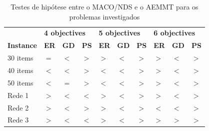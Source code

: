\begin{table}[htb]
	\centering
	\def\arraystretch{1.0}
	\caption{Testes de hipótese entre o MACO/NDS e o AEMMT para os problemas investigados}
	\label{tab_ztest_meamt}
	\begin{tabular}{llllllllll}
		& \multicolumn{3}{l}{\textbf{4 objectives}} & \multicolumn{3}{l}{\textbf{5 objectives}} & \multicolumn{3}{l}{\textbf{6 objectives
		}} \\
		\textbf{Instance} & \textbf{ER} & \textbf{GD} & \textbf{PS} & \textbf{ER} & \textbf{GD} & \textbf{PS} & \textbf{ER} & \textbf{GD} & \textbf{PS} \\ \hline
		30 items & \cellcolor{white} $=$ & \cellcolor{table-green} $<$ & \cellcolor{table-green} $>$ & \cellcolor{table-red} $>$ & \cellcolor{table-green} $<$ & \cellcolor{table-green} $>$ & \cellcolor{table-red} $>$ & \cellcolor{table-green} $<$ & \cellcolor{table-green} $>$ \\
		40 items & \cellcolor{table-green} $<$ & \cellcolor{table-green} $<$ & \cellcolor{table-green} $>$ & \cellcolor{table-green} $<$ & \cellcolor{table-green} $<$ & \cellcolor{table-green} $>$ & \cellcolor{table-red} $>$ & \cellcolor{table-green} $<$ & \cellcolor{table-green} $>$ \\
		50 items & \cellcolor{table-green} $<$ & \cellcolor{white} $=$ & \cellcolor{table-green} $>$ & \cellcolor{table-green} $<$ & \cellcolor{table-green} $<$ & \cellcolor{table-green} $>$ & \cellcolor{table-red} $>$ & \cellcolor{table-green} $<$ & \cellcolor{table-green} $>$ \\  \hline 
		Rede 1 & \cellcolor{table-red} $>$ & \cellcolor{table-green} $<$ & \cellcolor{table-red} $<$ & \cellcolor{table-red} $>$ & \cellcolor{table-green} $<$ & \cellcolor{table-green} $>$ & \cellcolor{table-red} $>$ & \cellcolor{table-green} $<$ & \cellcolor{table-green} $>$ \\
		Rede 2 & \cellcolor{table-red} $>$ & \cellcolor{table-green} $<$ & \cellcolor{table-green} $>$ & \cellcolor{table-red} $>$ & \cellcolor{table-green} $<$ & \cellcolor{table-green} $>$ & \cellcolor{table-green} $<$ & \cellcolor{table-green} $<$ & \cellcolor{table-green} $>$ \\
		Rede 3 & \cellcolor{table-red} $>$ & \cellcolor{table-green} $<$ & \cellcolor{table-red} $<$ & \cellcolor{table-red} $>$ & \cellcolor{table-green} $<$ & \cellcolor{table-green} $>$ & \cellcolor{table-red} $>$ & \cellcolor{table-red} $>$ & \cellcolor{table-green} $>$ \\  \hline 
	\end{tabular}
\end{table}

